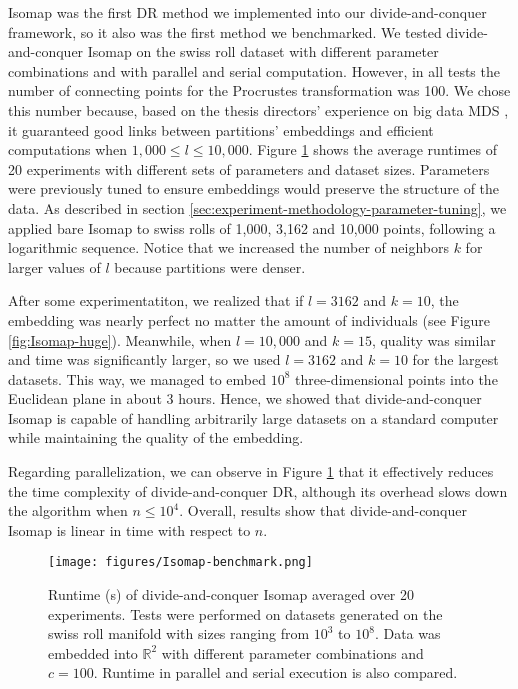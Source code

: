 Isomap was the first DR method we implemented into our divide-and-conquer framework, so it also was the first method we benchmarked. We tested divide-and-conquer Isomap on the swiss roll dataset with different parameter combinations and with parallel and serial computation. However, in all tests the number of connecting points for the Procrustes transformation was 100. We chose this number because, based on the thesis directors' experience on big data MDS \citep{Delicado2024}, it guaranteed good links between partitions' embeddings and efficient computations when $1,000 \leq l \leq 10,000$. Figure \ref{fig:Isomap-benchmark} shows the average runtimes of 20 experiments with different sets of parameters and dataset sizes. Parameters were previously tuned to ensure embeddings would preserve the structure of the data. As described in section \ref{sec:experiment-methodology-parameter-tuning}, we applied bare Isomap to swiss rolls of 1,000, 3,162 and 10,000 points, following a logarithmic sequence. Notice that we increased the number of neighbors $k$ for larger values of $l$ because partitions were denser.

After some experimentatiton, we realized that if $l=3162$ and $k=10$, the embedding was nearly perfect no matter the amount of individuals (see Figure \ref{fig:Isomap-huge}). Meanwhile, when $l=10,000$ and $k=15$, quality was similar and time was significantly larger, so we used $l=3162$ and $k=10$ for the largest datasets. This way, we managed to embed $10^8$ three-dimensional points into the Euclidean plane in about 3 hours. Hence, we showed that divide-and-conquer Isomap is capable of handling arbitrarily large datasets on a standard computer while maintaining the quality of the embedding.

Regarding parallelization, we can observe in Figure \ref{fig:Isomap-benchmark} that it effectively reduces the time complexity of divide-and-conquer DR, although its overhead slows down the algorithm when $n \leq 10^4$. Overall, results show that divide-and-conquer Isomap is linear in time with respect to $n$.

\begin{figure}[ht]
    \centering
    \texttt{[image: figures/Isomap-benchmark.png]}
    \caption{Runtime (s) of divide-and-conquer Isomap averaged over 20 experiments. Tests were performed on datasets generated on the swiss roll manifold \citep{Spiwokv2007} with sizes ranging from $10^3$ to $10^8$. Data was embedded into $\mathbb{R}^2$ with different parameter combinations and $c=100$. Runtime in parallel and serial execution is also compared.}
    \label{fig:Isomap-benchmark}
\end{figure}

